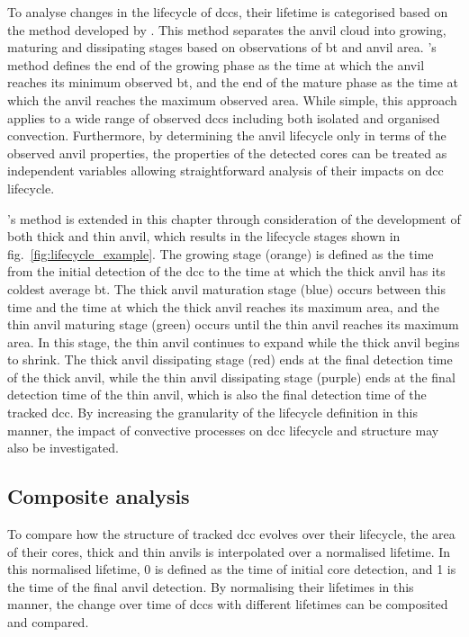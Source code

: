 To analyse changes in the lifecycle of \acrshort{dcc}s, their lifetime is categorised based on the method developed by \citet{futyan_deep_2007}.
This method separates the anvil cloud into growing, maturing and dissipating stages based on observations of \acrshort{bt} and anvil area.
\citeauthor{futyan_deep_2007}'s method defines the end of the growing phase as the time at which the anvil reaches its minimum observed \acrshort{bt}, and the end of the mature phase as the time at which the anvil reaches the maximum observed area.
While simple, this approach applies to a wide range of observed \acrshort{dcc}s including both isolated and organised convection.
Furthermore, by determining the anvil lifecycle only in terms of the observed anvil properties, the properties of the detected cores can be treated as independent variables allowing straightforward analysis of their impacts on \acrshort{dcc} lifecycle.

\citeauthor{futyan_deep_2007}'s method is extended in this chapter through consideration of the development of both thick and thin anvil, which results in the lifecycle stages shown in fig.~\ref{fig:lifecycle_example}.
The growing stage (orange) is defined as the time from the initial detection of the \acrshort{dcc} to the time at which the thick anvil has its coldest average \acrshort{bt}.
The thick anvil maturation stage (blue) occurs between this time and the time at which the thick anvil reaches its maximum area, and the thin anvil maturing stage (green) occurs until the thin anvil reaches its maximum area.
In this stage, the thin anvil continues to expand while the thick anvil begins to shrink.
The thick anvil dissipating stage (red) ends at the final detection time of the thick anvil, while the thin anvil dissipating stage (purple) ends at the final detection time of the thin anvil, which is also the final detection time of the tracked \acrshort{dcc}.
By increasing the granularity of the lifecycle definition in this manner, the impact of convective processes on \acrshort{dcc} lifecycle and structure may also be investigated.

\subsection{Composite analysis} \label{sec:composite_definition}

To compare how the structure of tracked \acrshort{dcc} evolves over their lifecycle, the area of their cores, thick and thin anvils is interpolated over a normalised lifetime.
In this normalised lifetime, 0 is defined as the time of initial core detection, and 1 is the time of the final anvil detection.
By normalising their lifetimes in this manner, the change over time of \acrshort{dcc}s with different lifetimes can be composited and compared.


